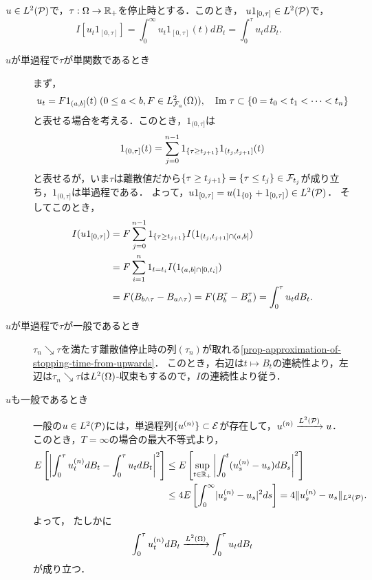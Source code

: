 \documentclass[uplatex,dvipdfmx]{jsreport}
\begin{document}
\begin{proposition}
    $u\in L^2(\P)$で，$\tau:\Om\to\R_+$を停止時とする．このとき，
    $u1_{[0,\tau]}\in L^2(\P)$で，
    \[I[u_t1_{[0,\tau]}]=\int^\infty_0u_t1_{[0,\tau]}(t)dB_t=\int^\tau_0u_tdB_t.\]
\end{proposition}
\begin{Proof}\mbox{}
    \begin{description}
        \item[$u$が単過程で$\tau$が単関数であるとき] 
        まず，
        \[u_t=F1_{(a,b]}(t)\;(0\le a<b,F\in L^2_{\F_a}(\Om)),\quad\Im\tau\subset\Brace{0=t_0<t_1<\cdots<t_n}\]
        と表せる場合を考える．このとき，$1_{(0,\tau]}$は
        \[1_{(0,\tau]}(t)=\sum^{n-1}_{j=0}1_{\Brace{\tau\ge t_{j+1}}}1_{(t_j,t_{j+1}]}(t)\]
        と表せるが，いま$\tau$は離散値だから$\Brace{\tau\ge t_{j+1}}=\Brace{\tau\le t_j}\in\F_{t_j}$が成り立ち，$1_{(0,\tau]}$は単過程である．
        よって，$u1_{[0,\tau]}=u(1_{\{0\}}+1_{[0,\tau]})\in L^2(\P)$．
        そしてこのとき，
        \begin{align*}
            I(u1_{[0,\tau]})&=F\sum^{n-1}_{j=0}1_{\Brace{\tau\ge t_{j+1}}}I(1_{(t_j,t_{j+1}]\cap(a,b]})\\
            &=F\sum^n_{i=1}1_{t=t_i}I(1_{(a,b]\cap[0,t_i]})\\
            &=F(B_{b\land\tau}-B_{a\land\tau})=F(B^\tau_b-B^\tau_a)=\int^\tau_0u_tdB_t.
        \end{align*}
        \item[$u$が単過程で$\tau$が一般であるとき] 
        $\tau_n\searrow\tau$を満たす離散値停止時の列$(\tau_n)$が取れる\ref{prop-approximation-of-stopping-time-from-upwards}．
        このとき，右辺は$t\mapsto B_t$の連続性より，左辺は$\tau_n\searrow\tau$は$L^2(\Om)$-収束もするので，$I$の連続性より従う．
        \item[$u$も一般であるとき] 
        一般の$u\in L^2(\P)$には，単過程列$\{u^{(n)}\}\subset\E$が存在して，$u^{(n)}\xrightarrow{L^2(\P)}u$．
        このとき，$T=\infty$の場合の最大不等式より，
        \begin{align*}
            E\Square{\Abs{\int^\tau_0u_t^{(n)}dB_t-\int^\tau_0u_tdB_t}^2}&\le E\Square{\sup_{t\in\R_+}\Abs{\int^t_0(u_s^{(n)}-u_s)dB_s}^2}\\
            &\le 4E\Square{\int^\infty_0\abs{u_s^{(n)}-u_s}^2ds}=4\norm{u_s^{(n)}-u_s}_{L^2(\P)}.
        \end{align*}
        よって，
        たしかに
        \[\int^\tau_0u_t^{(n)}dB_t\xrightarrow{L^2(\Om)}\int^\tau_0u_tdB_t\]
        が成り立つ．
    \end{description}
\end{Proof}
\end{document}
